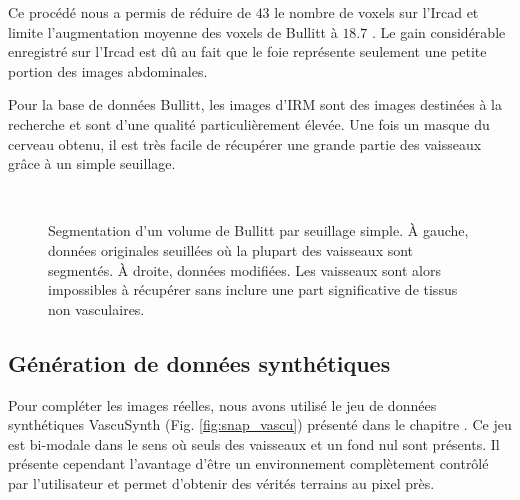 Ce procédé nous a permis de réduire de $43$ \percent{}le nombre de voxels sur l'Ircad et limite l'augmentation moyenne des voxels de Bullitt à $18.7$ \percent. Le gain considérable enregistré sur l'Ircad est dû au fait que le foie représente seulement une petite portion des images abdominales.

Pour la base de données Bullitt, les images d'IRM sont des images destinées à la recherche et sont d'une qualité particulièrement élevée. Une fois un masque du cerveau obtenu, il est très facile de récupérer une grande partie des vaisseaux grâce à un simple seuillage. 

\begin{figure}[!ht]
  \centering
   \\
  \caption{Segmentation d'un volume de Bullitt par seuillage simple. À gauche, données originales seuillées où la plupart des vaisseaux sont segmentés. À droite, données modifiées. Les vaisseaux sont alors impossibles à récupérer sans inclure une part significative de tissus non vasculaires.}
  \label{fig:modifications_bullitt}
\end{figure}

\subsection{Génération de données synthétiques}

Pour compléter les images réelles, nous avons utilisé le jeu de données synthétiques VascuSynth (Fig. \ref{fig:snap_vascu}) présenté dans le chapitre \chapContext{}. Ce jeu est bi-modale dans le sens où seuls des vaisseaux et un fond nul sont présents. Il présente cependant l'avantage d'être un environnement complètement contrôlé par l'utilisateur et permet d'obtenir des vérités terrains au pixel près. 


